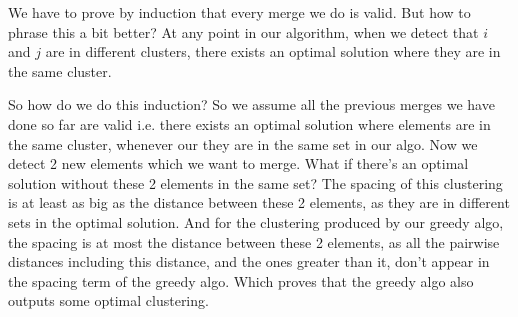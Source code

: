 \documentclass[12pt]{report}
\begin{document}
\begin{enumerate}[label=\textbf{\arabic*.}]
  We have to prove by induction that every merge we do is valid. But how to phrase this a bit better? At any point in our algorithm, when we detect that $i$ and $j$ are in different clusters, 
  there exists an optimal solution where they are in the same cluster.

  So how do we do this induction? So we assume all the previous merges we have done so far are valid i.e. there exists an optimal solution where elements are in the same cluster, whenever our 
  they are in the same set in our algo. Now we detect 2 new elements which we want to merge. What if there's an optimal solution without these 2 elements in the same set? The spacing of this 
  clustering is at least as big as the distance between these 2 elements, as they are in different sets in the optimal solution. And for the clustering produced by our greedy algo, the spacing
  is at most the distance between these 2 elements, as all the pairwise distances including this distance, and the ones greater than it, don't appear in the spacing term of the greedy algo. Which 
  proves that the greedy algo also outputs some optimal clustering.

\end{enumerate}
\end{document}
